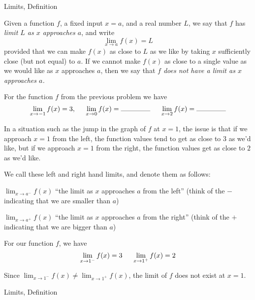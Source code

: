 \begin{tagblock}{Limits, Definition}
\begin{question}
Given a function $f$, a fixed input $x=a$, and a real number $L$, we say that $f$ has  \emph{limit $L$ as $x$ approaches $a$}, and write 
\[\lim_{x \to a}f(x) = L\]
provided that we can make $f(x)$ as close to $L$ as we like by taking $x$ sufficiently close (but not equal) to $a$. If we cannot make $f(x)$ as close to a single value as we would like as $x$ approaches $a$, then we say that \emph{$f$ does not have a limit as $x$ approaches $a$.}

For the function $f$ from the previous problem we have
\[ \lim_{x \to -1} f(x) = 3, \hspace{.2in}  \lim_{x \to 0} f(x) = \rule{1.5cm}{.1mm}  \hspace{.2in} \lim_{x \to 2} f(x) =  \rule{1.5cm}{.1mm}\]



In a situation such as the jump in the graph of $f$ at $x=1$, the issue is that if we approach $x=1$ from the left, the function values tend to get as close to $3$ as we'd like, but if we approach $x=1$ from the right, the function values get as close to $2$ as we'd like.

We call these left and right hand limits, and denote them as follows:
\smallskip

$\displaystyle \lim_{x \to a^-} f(x)$ ``the limit as $x$ approaches $a$ from the left''  (think of the $-$ indicating that we are smaller than $a$)\\
\bigskip

$\displaystyle \lim_{x \to a^+} f(x)$ ``the limit as $x$ approaches $a$ from the right'' (think of the $+$ indicating that we are bigger than $a$) \\

\bigskip


For our function $f$, we have
\[ \lim_{x \to 1^-} f(x) = 3 \hspace{.2in}  \lim_{x \to 1^+} f(x) = 2 \]

Since $\displaystyle  \lim_{x \to 1^-} f(x) \neq  \lim_{x \to 1^+} f(x)$,  the limit of $f$ does not exist at $x=1$.
\bigskip
	
	
\begin{tags}
	    Limits, Definition
\end{tags}
	
\begin{diary}
	    
\end{diary}
	
\begin{solution}
	  
\end{solution}
	
\end{question}

\end{tagblock}


